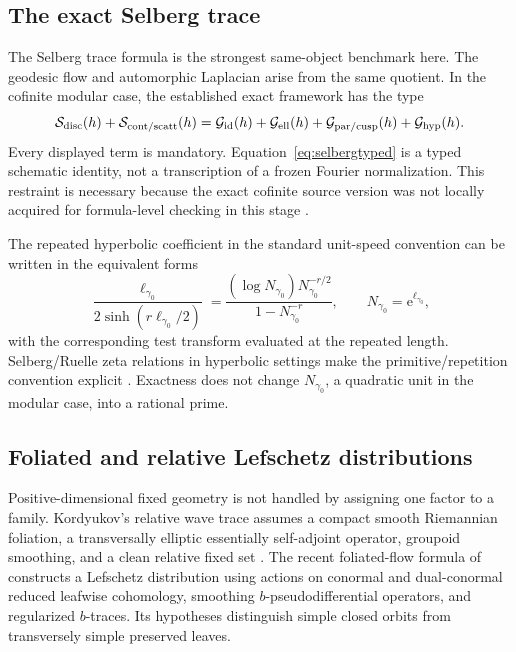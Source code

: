 \documentclass[11pt]{article}
\theoremstyle{definition}
\theoremstyle{remark}
\newcommand{\e}{\mathrm{e}}
\begin{document}
\subsection{The exact Selberg trace}

The Selberg trace formula is the strongest same-object benchmark here.  The
geodesic flow and automorphic Laplacian arise from the same quotient.  In the
cofinite modular case, the established exact framework has the type
\begin{equation}
 \mathcal S_{\rm disc}(h)+\mathcal S_{\rm cont/scatt}(h)
 =\mathcal G_{\rm id}(h)+\mathcal G_{\rm ell}(h)
  +\mathcal G_{\rm par/cusp}(h)+\mathcal G_{\rm hyp}(h).
 \label{eq:selbergtyped}
\end{equation}
Every displayed term is mandatory.  Equation~\eqref{eq:selbergtyped} is a
typed schematic identity, not a transcription of a frozen Fourier
normalization.  This restraint is necessary because the exact cofinite source
version was not locally acquired for formula-level checking in this stage
\citep{Selberg1956,Hejhal1983}.

The repeated hyperbolic coefficient in the standard unit-speed convention can
be written in the equivalent forms
\begin{equation}
 \frac{\ell_{\gamma_0}}{2\sinh(r\ell_{\gamma_0}/2)}
 =\frac{(\log N_{\gamma_0})N_{\gamma_0}^{-r/2}}
        {1-N_{\gamma_0}^{-r}},
 \qquad N_{\gamma_0}=\e^{\ell_{\gamma_0}},
 \label{eq:hyperboliccoefficient}
\end{equation}
with the corresponding test transform evaluated at the repeated length.
Selberg/Ruelle zeta relations in hyperbolic settings make the
primitive/repetition convention explicit \citep{Fried1986}.  Exactness does
not change \(N_{\gamma_0}\), a quadratic unit in the modular case, into a
rational prime.

\subsection{Foliated and relative Lefschetz distributions}

Positive-dimensional fixed geometry is not handled by assigning one factor
to a family.  Kordyukov's relative wave trace assumes a compact smooth
Riemannian foliation, a transversally elliptic essentially self-adjoint
operator, groupoid smoothing, and a clean relative fixed set
\citep{Kordyukov2001}.  The recent foliated-flow formula of \citet{AlvarezKordyukovLeichtnam2026}
constructs a Lefschetz distribution using actions on conormal and
dual-conormal reduced leafwise cohomology, smoothing \(b\)-pseudodifferential
operators, and regularized \(b\)-traces.  Its hypotheses distinguish simple
closed orbits from transversely simple preserved leaves.
\end{document}

